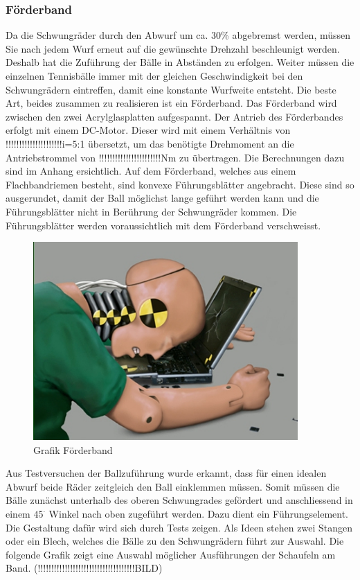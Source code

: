 \subsubsection{Förderband}
Da die Schwungräder durch den Abwurf um ca. 30\% abgebremst werden, müssen Sie nach jedem Wurf erneut auf die gewünschte Drehzahl beschleunigt werden. Deshalb hat die Zuführung der Bälle in Abständen zu erfolgen. Weiter müssen die einzelnen Tennisbälle immer mit der gleichen Geschwindigkeit bei den Schwungrädern eintreffen, damit eine konstante Wurfweite entsteht. Die beste Art, beides zusammen zu realisieren ist ein Förderband. Das Förderband wird zwischen den zwei Acrylglasplatten aufgespannt. Der Antrieb des Förderbandes erfolgt mit einem DC-Motor. Dieser wird mit einem Verhältnis von !!!!!!!!!!!!!!!!!!!!!i=5:1 übersetzt, um das benötigte Drehmoment an die Antriebstrommel von !!!!!!!!!!!!!!!!!!!!!!!Nm zu übertragen. Die Berechnungen dazu sind im Anhang ersichtlich. Auf dem Förderband, welches aus einem Flachbandriemen besteht, sind konvexe Führungsblätter angebracht. Diese sind so ausgerundet, damit der Ball möglichst lange geführt werden kann und die Führungsblätter nicht in Berührung der Schwungräder kommen. Die Führungsblätter werden voraussichtlich mit dem Förderband verschweisst.
\newpage
\begin{figure} [h!]
	\centering
	\includegraphics[width=0.9\textwidth]{Enddokumentation/CrashTestDummy.jpg}
	\caption{Grafik Förderband}
	\label{fig:Grafik Förderband}	
\end{figure}
Aus Testversuchen der Ballzuführung wurde erkannt, dass für einen idealen Abwurf beide Räder zeitgleich den Ball einklemmen müssen. Somit müssen die Bälle zunächst unterhalb des oberen Schwungrades gefördert und anschliessend in einem $45^\cdot$ Winkel nach oben zugeführt werden. Dazu dient ein Führungselement. Die Gestaltung dafür wird sich durch Tests zeigen. Als Ideen stehen zwei Stangen oder ein Blech, welches die Bälle zu den Schwungrädern führt zur Auswahl. Die folgende Grafik zeigt eine Auswahl möglicher Ausführungen der Schaufeln am Band. (!!!!!!!!!!!!!!!!!!!!!!!!!!!!!!!!!!!!BILD)
